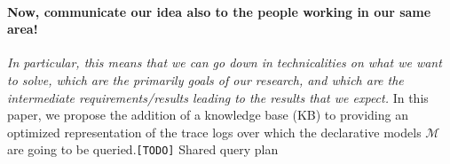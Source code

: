 \paragraph*{Now, communicate our idea also to the people working in our same area!} \textit{In particular, this means that we can go down in technicalities on what we want to solve, which are the primarily goals of our research, and which are the intermediate requirements/results leading to the results that we expect.} 
In this paper, we propose the addition of a knowledge base (KB) to providing an optimized representation of the trace logs over which the declarative models $\mathcal{M}$ are going to be queried.\texttt{\color{red}[TODO]} %
Shared query plan \cite{BellatrecheKB21}
